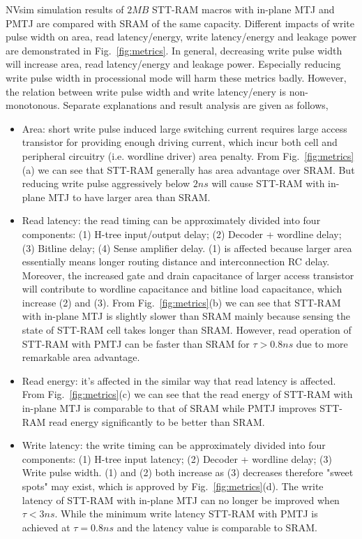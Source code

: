 NVsim simulation results of $2MB$ STT-RAM macros with in-plane MTJ and PMTJ are compared with SRAM of the same capacity. Different impacts of write pulse width on area, read latency/energy, write latency/energy and leakage power are demonstrated in Fig.~\ref{fig:metrics}. In general, decreasing write pulse width will increase area, read latency/energy and leakage power. Especially reducing write pulse width in processional mode will harm these metrics badly. However, the relation between write pulse width and write latency/enery is non-monotonous. Separate explanations and result analysis are given as follows,
\begin{itemize}
\item Area: short write pulse induced large switching current requires large access transistor for providing enough driving current, which incur both cell and peripheral circuitry (i.e. wordline driver) area penalty. From Fig.~\ref{fig:metrics}(a) we can see that STT-RAM generally has area advantage over SRAM. But reducing write pulse aggressively below $2ns$ will cause STT-RAM with in-plane MTJ to have larger area than SRAM.
\item Read latency: the read timing can be approximately divided into four components: (1) H-tree input/output delay; (2) Decoder + wordline delay; (3) Bitline delay; (4) Sense amplifier delay. (1) is affected because larger area essentially means longer routing distance and interconnection RC delay. Moreover, the increased gate and drain capacitance of larger access transistor will contribute to wordline capacitance and bitline load capacitance, which increase (2) and (3). From Fig.~\ref{fig:metrics}(b) we can see that STT-RAM with in-plane MTJ is slightly slower than SRAM mainly because sensing the state of STT-RAM cell takes longer than SRAM. However, read operation of STT-RAM with PMTJ can be faster than SRAM for $\tau > 0.8ns$ due to more remarkable area advantage.
\item Read energy: it's affected in the similar way that read latency is affected. From Fig.~\ref{fig:metrics}(c) we can see that the read energy of STT-RAM with in-plane MTJ is comparable to that of SRAM while PMTJ improves STT-RAM read energy significantly to be better than SRAM.
\item Write latency: the write timing can be approximately divided into four components: (1) H-tree input latency; (2) Decoder + wordline delay; (3) Write pulse width. (1) and (2) both increase as (3) decreases therefore "sweet spots" may exist, which is approved by Fig.~\ref{fig:metrics}(d). The write latency of STT-RAM with in-plane MTJ can no longer be improved when $\tau < 3ns$. While the minimum write latency STT-RAM with PMTJ is achieved at $\tau = 0.8ns$ and the latency value is comparable to SRAM.

\end{itemize}
